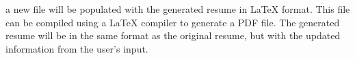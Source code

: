 a new file will be populated with the generated resume in LaTeX format. This file can be compiled using a LaTeX compiler to generate a PDF file. The generated resume will be in the same format as the original resume, but with the updated information from the user's input.